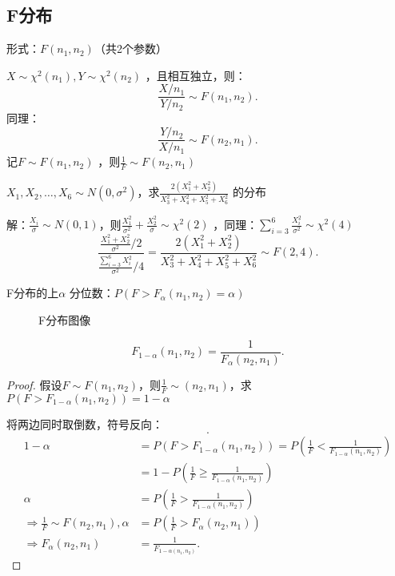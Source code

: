 \subsection{F分布}%
\label{sub:F分布}
形式：$F\left( n_1,n_2 \right)$（共2个参数）
\begin{cor}
    $X\sim \chi^2 \left( n_1 \right),Y\sim \chi^2 \left( n_2 \right)$ ，且相互独立，则：\[
        \frac{X /n_1}{Y /n_2}\sim F\left( n_1,n_2 \right)
    .\]
    同理： \[
        \frac{Y /n_2}{X /n_1}\sim F\left( n_2,n_1 \right)
    .\]
    记$F\sim F\left( n_1,n_2 \right)$ ，则$\frac{1}{F}\sim F\left( n_2,n_1 \right)$
\end{cor}
\begin{eg}
    $X_1,X_2,\ldots ,X_6\sim N\left( 0,\sigma^2  \right)$，求$\frac{2\left( X_1^2 +X_2^2  \right)}{X_3^2 +X_4^2 +X_5^2 +X_6^2 }$ 的分布
\end{eg}
解：$\frac{X_{i}}{\sigma}\sim N\left( 0,1 \right)$，则$\frac{X_1^2 }{\sigma^2 }+\frac{X_2^2 }{\sigma}\sim \chi^2 \left( 2 \right)$ ，同理：$\sum_{i=3}^{6} \frac{X_{i}^2 }{\sigma^2 }\sim \chi^2 \left( 4 \right)$
\[
    \frac{ \frac{X_1^2 +X_2^2 }{\sigma^2 } /2 }{\frac{\sum_{i=3}^{6} X_{i}^2 }{\sigma^2 } /4}=\frac{2\left( X_1^2 +X_2^2  \right)}{X_3^2+X_4^2 +X_5^2+X_6^2 } \sim F\left( 2,4 \right)
.\]
\begin{notation}
    F分布的上$\alpha$ 分位数：$P\left( F>F_{\alpha}\left( n_1,n_2 \right)=\alpha \right)$
\end{notation}
\begin{figure}[ht]
    \centering
    \caption{F分布图像}
    \label{fig:f分布图像}
\end{figure}
\begin{cor}
    \[
        F_{1-\alpha}\left( n_1,n_2 \right)=\frac{1}{F_{\alpha}\left( n_2,n_1 \right)}
    .\]
\end{cor}
\begin{proof}
    假设$F\sim F\left( n_1,n_2 \right)$，则$\frac{1}{F}\sim \left( n_2,n_1 \right)$，求$P\left( F>F_{1-\alpha}\left( n_1,n_2 \right) \right)=1-\alpha$ 

    将两边同时取倒数，符号反向：\[
    .\]
    \begin{align*}
        1-\alpha&=P\left( F>F_{1-\alpha}\left( n_1,n_2 \right) \right)=P\left( \frac{1}{F}<\frac{1}{F_{1-\alpha}\left( n_1,n_2 \right)} \right) \\
        &= 1-P\left( \frac{1}{F}\ge \frac{1}{F_{1-\alpha}\left( n_1,n_2 \right)} \right) \\
        \alpha &= P\left( \frac{1}{F}>\frac{1}{F_{1-\alpha}\left( n_1,n_2 \right)} \right)\\
        \Rightarrow \frac{1}{F}\sim F\left( n_2,n_1 \right), \alpha &=P\left( \frac{1}{F}>F_\alpha\left( n_2,n_1 \right) \right) \\
        \Rightarrow F_\alpha\left( n_2,n_1 \right)&=\frac{1}{F_{1-\alpha\left( n_1,n_2 \right)}}
    .\end{align*}
\end{proof}
